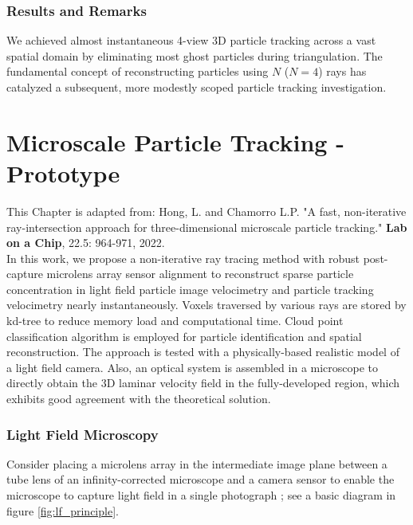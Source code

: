 \documentclass[draftthesis,fullpage]{uiucthesis}
\begin{document}
\subsection*{Results and Remarks}
We achieved almost instantaneous 4-view 3D particle tracking across a vast spatial domain by eliminating most ghost particles during triangulation. The fundamental concept of reconstructing particles using $N$ ($N = 4$) rays has catalyzed a subsequent, more modestly scoped particle tracking investigation.


\chapter{Microscale Particle Tracking - Prototype}\label{chapter:MPT}
\vspace{-15mm}
This Chapter is adapted from: Hong, L. and  Chamorro L.P. "A fast, non-iterative ray-intersection approach for three-dimensional microscale particle tracking." \textbf{Lab on a Chip}, 22.5: 964-971, 2022.
\\

In this work, we propose a non-iterative ray tracing method with robust post-capture microlens array sensor alignment to reconstruct sparse particle concentration in light field particle image velocimetry and particle tracking velocimetry nearly instantaneously. Voxels traversed by various rays are stored by kd-tree to reduce memory load and computational time. Cloud point classification algorithm is employed for particle identification and spatial reconstruction. The approach is tested with a physically-based realistic model of a light field camera. Also, an optical system is assembled in a microscope to directly obtain the 3D laminar velocity field in the fully-developed region, which exhibits good agreement with the theoretical solution.

\subsection*{Light Field Microscopy}
Consider placing a microlens array in the intermediate image plane between a tube lens of an infinity-corrected microscope and a camera sensor to enable the microscope to capture light field in a single photograph \citep{levoy2006light}; see a basic diagram in figure \ref{fig:lf_principle}.
\end{document}
